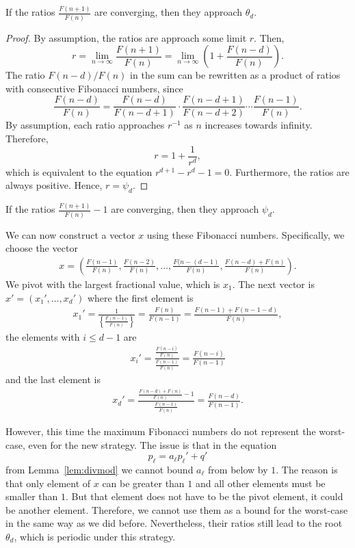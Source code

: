 \begin{theorem}
  If the ratios $\frac{F(n+1)}{F(n)}$ are converging, then they approach $θ_d$.
\end{theorem}

\begin{proof}
  By assumption, the ratios are approach some limit $r$.
  Then,
  \[
    r
    = \lim_{n → ∞} \frac{F(n+1)}{F(n)}
    = \lim_{n → ∞} \left(1 + \frac{F(n-d)}{F(n)}\right).
  \]
  The ratio $F(n-d)/F(n)$ in the sum can be rewritten as a product of ratios with
  consecutive Fibonacci numbers, since
  \[
    \frac{F(n - d)}{F(n)}
    = \frac{F(n - d)}{F(n - d + 1)} · \frac{F(n - d + 1)}{F(n - d + 2)} ⋯ \frac{F(n - 1)}{F(n)}.
  \]
  By assumption, each ratio approaches $r^{-1}$ as $n$ increases towards infinity.
  Therefore,
  \[
    r = 1 + \frac{1}{r^d},
  \]
  which is equivalent to the equation $r^{d+1} - r^d - 1 = 0$.
  Furthermore, the ratios are always positive.
  Hence, $r = ψ_d$.
\end{proof}

\begin{corollary}
  If the ratios $\frac{F(n+1)}{F(n)} - 1$ are converging, then they approach $ψ_d$.
\end{corollary}

We can now construct a vector $x$ using these Fibonacci numbers.
Specifically, we choose the vector
\begin{align*}
  x = \left(
    \frac{F(n-1)}{F(n)},
    \frac{F(n-2)}{F(n)},
    …,
    \frac{F(n-(d-1)}{F(n)},
    \frac{F(n-d) + F(n)}{F(n)} \right).
\end{align*}
We pivot with the largest fractional value, which is $x_1$.
The next vector is $x' = (x₁', …, x_d')$ where
the first element is
\begin{align*}
  x_1'
  = \frac{1}{\left\{\frac{F(n-1)}{F(n)}\right\}}
  = \frac{F(n)}{F(n-1)}
  = \frac{F(n-1) + F(n-1-d)}{F(n)},
\end{align*}
the elements with $i ≤ d - 1$ are
\begin{align*}
  x_i'
  = \frac{\frac{F(n-i)}{F(n)}}{\frac{F(n-1)}{F(n)}}
  = \frac{F(n-i)}{F(n-1)}
\end{align*}
and the last element is
\begin{align*}
  x_d'
  = \frac{\frac{F(n-d) + F(n)}{F(n)} - 1}{\frac{F(n-1)}{F(n)}}
  = \frac{F(n-d)}{F(n-1)}.
\end{align*}

However, this time the maximum Fibonacci numbers do not represent the worst-case,
even for the new strategy.
The issue is that in the equation
\[
  p_ℓ = a_ℓ p_ℓ' + q'
\]
from Lemma~\ref{lem:divmod} we cannot bound $a_ℓ$ from below by $1$.
The reason is that only element of $x$ can be greater than $1$
and all other elements must be smaller than $1$.
But that element does not have to be the pivot element,
it could be another element.
Therefore, we cannot use them as a bound for the worst-case
in the same way as we did before.
Nevertheless, their ratios still lead to the root $θ_d$,
which is periodic under this strategy.

